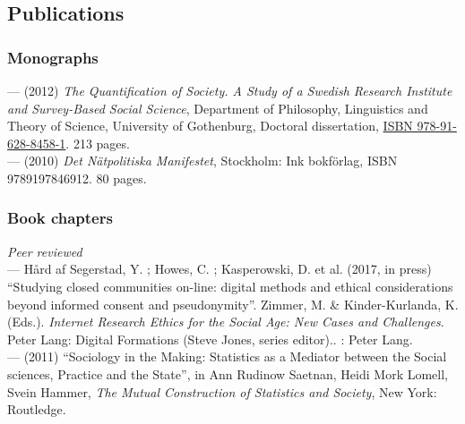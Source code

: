 \documentclass[a4paper,11pt,oneside]{article}
\begin{document}

\clearpage
\setlength\parindent{0cm}
\subsection{Publications}

\subsubsection{Monographs}
    --- (2012) \emph{The Quantification of Society. A Study of a Swedish Research Institute
    and Survey-Based Social Science}, Department of Philosophy, Linguistics and Theory of Science, University of Gothenburg, Doctoral dissertation,  \href{https://gupea.ub.gu.se/handle/2077/28807}{ISBN 978-91-628-8458-1}. 213 pages.\\
    --- (2010) \emph{Det Nätpolitiska Manifestet}, Stockholm: Ink bokförlag, ISBN 9789197846912. 80 pages.

\subsubsection{Book chapters}
  \noindent  \emph{Peer reviewed} \\
  --- Hård af Segerstad, Y. ; Howes, C. ; Kasperowski, D. et al. (2017, in press) ``Studying closed communities on-line: digital methods and ethical considerations beyond informed consent and pseudonymity''. Zimmer, M. & Kinder-Kurlanda, K. (Eds.). \emph{Internet Research Ethics for the Social Age: New Cases and Challenges}. Peter Lang: Digital Formations (Steve Jones, series editor).. : Peter Lang. \\
  --- (2011) ``Sociology in the Making: Statistics as a Mediator between the Social sciences, Practice and the State'', in Ann Rudinow Saetnan, Heidi Mork Lomell, Svein Hammer, \emph{The Mutual Construction of Statistics and Society}, New York: Routledge.\\
\end{document}
